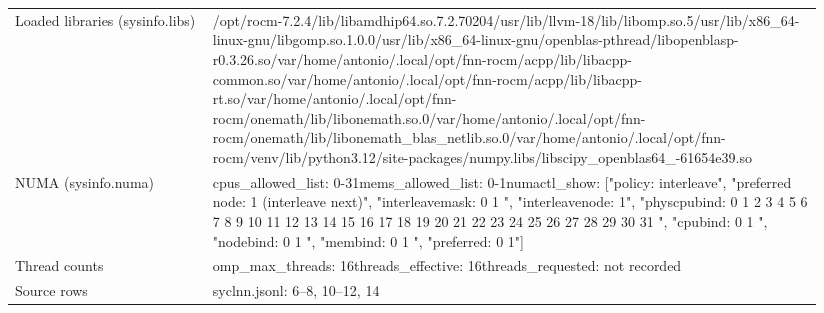 \begin{longtable}{>{\raggedright\arraybackslash}p{0.23\linewidth}>{\raggedright\arraybackslash}p{0.71\linewidth}}
Loaded libraries (sysinfo.libs) & /\allowbreak{}opt/\allowbreak{}rocm-7.2.4/\allowbreak{}lib/\allowbreak{}libamdhip64.so.7.2.70204\newline /\allowbreak{}usr/\allowbreak{}lib/\allowbreak{}llvm-18/\allowbreak{}lib/\allowbreak{}libomp.so.5\newline /\allowbreak{}usr/\allowbreak{}lib/\allowbreak{}x86\_\allowbreak{}64-linux-gnu/\allowbreak{}libgomp.so.1.0.0\newline /\allowbreak{}usr/\allowbreak{}lib/\allowbreak{}x86\_\allowbreak{}64-linux-gnu/\allowbreak{}openblas-pthread/\allowbreak{}libopenblasp-r0.3.26.so\newline /\allowbreak{}var/\allowbreak{}home/\allowbreak{}antonio/\allowbreak{}.local/\allowbreak{}opt/\allowbreak{}fnn-rocm/\allowbreak{}acpp/\allowbreak{}lib/\allowbreak{}libacpp-common.so\newline /\allowbreak{}var/\allowbreak{}home/\allowbreak{}antonio/\allowbreak{}.local/\allowbreak{}opt/\allowbreak{}fnn-rocm/\allowbreak{}acpp/\allowbreak{}lib/\allowbreak{}libacpp-rt.so\newline /\allowbreak{}var/\allowbreak{}home/\allowbreak{}antonio/\allowbreak{}.local/\allowbreak{}opt/\allowbreak{}fnn-rocm/\allowbreak{}onemath/\allowbreak{}lib/\allowbreak{}libonemath.so.0\newline /\allowbreak{}var/\allowbreak{}home/\allowbreak{}antonio/\allowbreak{}.local/\allowbreak{}opt/\allowbreak{}fnn-rocm/\allowbreak{}onemath/\allowbreak{}lib/\allowbreak{}libonemath\_\allowbreak{}blas\_\allowbreak{}netlib.so.0\newline /\allowbreak{}var/\allowbreak{}home/\allowbreak{}antonio/\allowbreak{}.local/\allowbreak{}opt/\allowbreak{}fnn-rocm/\allowbreak{}venv/\allowbreak{}lib/\allowbreak{}python3.12/\allowbreak{}site-packages/\allowbreak{}numpy.libs/\allowbreak{}libscipy\_\allowbreak{}openblas64\_\allowbreak{}-61654e39.so \\
NUMA (sysinfo.numa) & cpus\_\allowbreak{}allowed\_\allowbreak{}list: 0-31\newline mems\_\allowbreak{}allowed\_\allowbreak{}list: 0-1\newline numactl\_\allowbreak{}show: ["policy: interleave", "preferred node: 1 (interleave next)", "interleavemask: 0 1 ", "interleavenode: 1", "physcpubind: 0 1 2 3 4 5 6 7 8 9 10 11 12 13 14 15 16 17 18 19 20 21 22 23 24 25 26 27 28 29 30 31 ", "cpubind: 0 1 ", "nodebind: 0 1 ", "membind: 0 1 ", "preferred: 0 1"] \\
Thread counts & omp\_\allowbreak{}max\_\allowbreak{}threads: 16\newline threads\_\allowbreak{}effective: 16\newline threads\_\allowbreak{}requested: not recorded \\
Source rows & syclnn.jsonl: 6–8, 10–12, 14 \\
\end{longtable}
